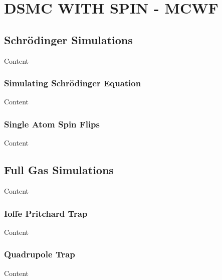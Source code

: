 
\chapter{DSMC WITH SPIN - MCWF} %

\label{ch:dsmcmcwf} %


\section{Schr\"odinger Simulations}

Content


\subsection{Simulating Schr\"odinger Equation}

Content


\subsection{Single Atom Spin Flips}

Content


\section{Full Gas Simulations}

Content


\subsection{Ioffe Pritchard Trap}

Content


\subsection{Quadrupole Trap}

Content